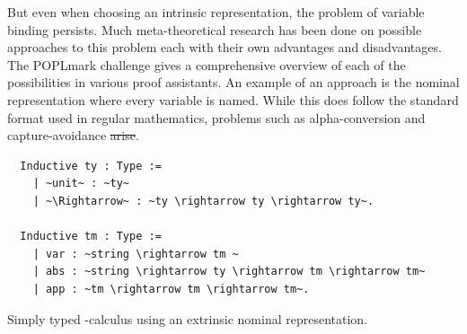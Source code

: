 \documentclass[12pt, final]{article}
\providecommand{\DIFaddtex}[1]{{\protect\color{blue}\uwave{#1}}} %
\providecommand{\DIFdeltex}[1]{{\protect\color{red}\sout{#1}}}                      %
\providecommand{\DIFaddbegin}{} %
\providecommand{\DIFaddend}{} %
\providecommand{\DIFdelbegin}{} %
\providecommand{\DIFdelend}{} %
\providecommand{\DIFadd}[1]{\texorpdfstring{\DIFaddtex{#1}}{#1}} %
\providecommand{\DIFdel}[1]{\texorpdfstring{\DIFdeltex{#1}}{}} %
\newcommand{\DIFscaledelfig}{0.5}
\newlength{\DIFdelgraphicswidth} %
\newlength{\DIFdelgraphicsheight} %
\newcommand{\DIFaddincludegraphics}[2][]{{\color{blue}\fbox{\DIFOincludegraphics[#1]{#2}}}} %
\newcommand{\DIFdelincludegraphics}[2][]{%
\sbox{\DIFdelgraphicsbox}{\DIFOincludegraphics[#1]{#2}}%
\settoboxwidth{\DIFdelgraphicswidth}{\DIFdelgraphicsbox} %
\settoboxtotalheight{\DIFdelgraphicsheight}{\DIFdelgraphicsbox} %
\scalebox{\DIFscaledelfig}{%
\parbox[b]{\DIFdelgraphicswidth}{\usebox{\DIFdelgraphicsbox}\\[-\baselineskip] \rule{\DIFdelgraphicswidth}{0em}}\llap{\resizebox{\DIFdelgraphicswidth}{\DIFdelgraphicsheight}{%
\setlength{\unitlength}{\DIFdelgraphicswidth}%
\begin{picture}(1,1)%
\thicklines\linethickness{2pt} %
{\color[rgb]{1,0,0}\put(0,0){\framebox(1,1){}}}%
{\color[rgb]{1,0,0}\put(0,0){\line( 1,1){1}}}%
{\color[rgb]{1,0,0}\put(0,1){\line(1,-1){1}}}%
\end{picture}%
}\hspace*{3pt}}} %
} %
\DeclareRobustCommand{\DIFaddbegin}{\DIFOaddbegin \let\includegraphics\DIFaddincludegraphics} %
\DeclareRobustCommand{\DIFaddend}{\DIFOaddend \let\includegraphics\DIFOincludegraphics} %
\DeclareRobustCommand{\DIFdelbegin}{\DIFOdelbegin \let\includegraphics\DIFdelincludegraphics} %
\DeclareRobustCommand{\DIFdelend}{\DIFOaddend \let\includegraphics\DIFOincludegraphics} %
\begin{document}
But even when choosing an intrinsic representation, the problem of variable binding persists.
Much meta-theoretical research has been done on possible approaches to this problem each with their own advantages and disadvantages.
The POPLmark challenge gives a comprehensive overview of each of the possibilities in various proof assistants\cite{Aydemir2005}.
An example of an approach is the nominal representation where every variable is named.
While this does follow the standard format used in regular mathematics, problems such as alpha-conversion and capture-avoidance \DIFdelbegin \DIFdel{arise}\DIFdelend \DIFaddbegin \DIFadd{appears}\DIFaddend .

\begin{listing}[h]
  \begin{verbatim}
  Inductive ty : Type :=
    | ~unit~ : ~ty~
    | ~\Rightarrow~ : ~ty \rightarrow ty \rightarrow ty~.

  Inductive tm : Type :=
    | var : ~string \rightarrow tm ~
    | abs : ~string \rightarrow ty \rightarrow tm \rightarrow tm~
    | app : ~tm \rightarrow tm \rightarrow tm~.
  \end{verbatim}
  \caption{Simply typed \lambda-calculus using an extrinsic nominal representation.}
  \label{lst:nominal_stlc}
\end{listing}
\end{document}
